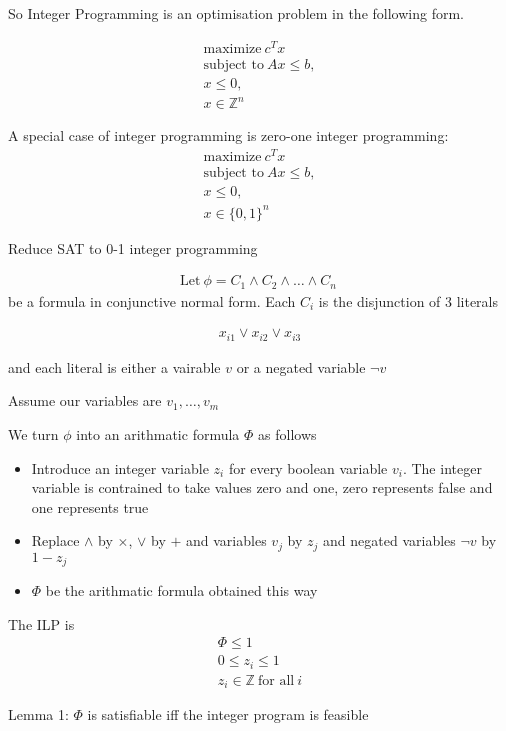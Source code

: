 \documentclass[mathserif]{beamer}
\begin{document}
\begin{frame}
So Integer Programming is an optimisation problem in the following form.

\begin{align*}
\text{maximize}\ c^Tx\\
\text{subject to}\ Ax \leq b,\\
x \leq 0,\\
x \in \mathbb{Z}^n
\end{align*}

\pause

A special case of integer programming is zero-one integer programming:
\begin{align*}
\text{maximize}\ c^Tx\\
\text{subject to}\ Ax \leq b,\\
x \leq 0,\\
x \in \{0, 1\}^n
\end{align*}
\end{frame}

Reduce SAT to 0-1 integer programming

\begin{align*}
\text{Let}\ \phi = C_1 \wedge C_2 \wedge \ldots \wedge C_n\
\end{align*}
be a formula in conjunctive normal form. Each $C_i$ is the disjunction of 3 literals

\begin{align*}
x_{i1} \vee x_{i2} \vee x_{i3}
\end{align*}

and each literal is either a vairable $v$ or a negated variable $\neg v$

Assume our variables are $v_1, \ldots, v_m$

\begin{frame}
We turn $\phi$ into an arithmatic formula $\Phi$ as follows
\begin{itemize}
\item Introduce an integer variable $z_i$ for every boolean variable $v_i$. The integer variable is contrained to take values zero and one, zero represents false and one represents true
\item Replace $\wedge$ by $\times$, $\vee$ by $+$ and variables $v_j$ by $z_j$ and negated variables $\neg v$ by $1 - z_j$
\item $\Phi$ be the arithmatic formula obtained this way
\end{itemize}
\end{frame}

\begin{frame}
The ILP is
\begin{align*}
\Phi \leq 1\\
0 \leq z_i \leq 1\\
z_i \in \mathbb{Z}\ \text{for all}\ i
\end{align*}

Lemma 1: $\Phi$ is satisfiable iff the integer program is feasible
\end{frame}
\end{document}
